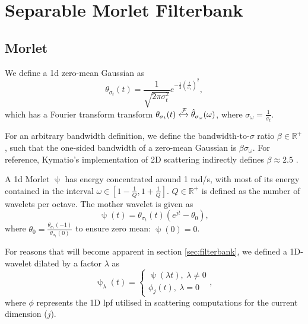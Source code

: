 \documentclass[journal]{IEEEtran}
\begin{document}
\section{Separable Morlet Filterbank}


\subsection{Morlet}

We define a \ac{1d} zero-mean Gaussian as
\begin{equation}
    \theta_{\sigma_t}(t) = \frac{1}{\sqrt{2\pi\sigma_t^2}}e^{-\frac{1}{2}\left(\frac{t}{\sigma_t}\right)^2},
\end{equation}
which has a Fourier transform transform $\theta_{\sigma_t}(t) \xleftrightarrow{\mathcal{F}} \hat{\theta}_{\sigma_\omega}(\omega)$, where $\sigma_\omega = \frac{1}{\sigma_t}$.

For an arbitrary bandwidth definition, we define the bandwidth-to-$\sigma$ ratio $\beta \in \mathbb{R}^+$, such that the one-sided bandwidth of a zero-mean Gaussian is $\beta \sigma_\omega$. For reference, Kymatio's implementation of 2D scattering indirectly defines $\beta \approx 2.5$ \cite{kymatio}.


A \ac{1d} Morlet $\uppsi$ has energy concentrated around 1 rad/s, with most of its energy contained in the interval $\omega \in [1 - \frac{1}{Q}, 1 + \frac{1}{Q}]$. $Q \in \mathbb{R}^+$ is defined as the number of wavelets per octave. The mother wavelet is given as
\begin{equation}
    \uppsi(t) = \theta_{\sigma_t}(t)\left(e^{jt} - \theta_0 \right),
\end{equation}
where $\theta_0 = \frac{\theta_{\sigma_t}(-1)}{\theta_{\sigma_t}(0)}$ to ensure zero mean: $\hat{\uppsi}(0) = 0$.

For reasons that will become apparent in section \ref{sec:filterbank}, we defined a 1D-wavelet dilated by a factor $\lambda$ as 
\begin{equation}
\label{eqn:dilwav}
    \uppsi_\lambda(t) = \begin{cases}
        \uppsi(\lambda t), \ \lambda \neq 0 \\
        \phi_j(t), \ \lambda = 0
    \end{cases},
\end{equation}
where $\phi$ represents the 1D \ac{lpf} utilised in scattering computations for the current dimension ($j$).
\end{document}
